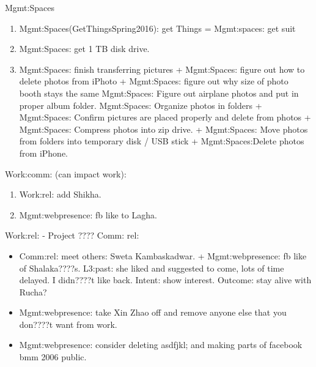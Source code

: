 {\begin{columns}
\begin{column}{0.5\columnwidth}
\begin{block}{Mgmt:Spaces}
\begin{enumerate} 
\item \tiny Mgmt:Spaces(GetThingsSpring2016): get Things = Mgmt:spaces: get suit
\item \tiny Mgmt:Spaces: get 1 TB disk drive. 
\item \tiny Mgmt:Spaces: finish transferring pictures + Mgmt:Spaces: figure out
how to delete photos from iPhoto + Mgmt:Spaces: figure out why size of
photo booth stays the same  Mgmt:Spaces: Figure out airplane photos
and put in proper album folder. Mgmt:Spaces: Organize photos in
folders + Mgmt:Spaces: Confirm pictures are placed properly and delete
from photos + Mgmt:Spaces: Compress photos into zip drive. +
Mgmt:Spaces: Move photos from folders into temporary disk / USB stick 
+ Mgmt:Spaces:Delete photos from iPhone.
\end{enumerate} 
\end{block}

\begin{block}{Work:comm: (can impact work):}
\begin{enumerate}
\tiny \item \tiny Work:rel: add Shikha.
\item \tiny Mgmt:webpresence: fb like to Lagha. 
\end{enumerate}
\end{block} 

\begin{block}{Work:rel: -  Project ???? Comm: rel:}
\begin{itemize} 
\item \tiny Comm:rel: meet others:  Sweta Kambaskadwar. + Mgmt:webpresence: fb
like of Shalaka????s. L3:past: she liked and suggested to come, lots of
time delayed. I didn????t like back.  Intent: show interest. Outcome:
stay alive with Rucha?
\item \tiny Mgmt:webpresence: take Xin Zhao off and remove anyone else that you
don????t want from work.
\item \tiny Mgmt:webpresence: consider deleting asdfjkl;  and making parts of facebook bmm 2006 public. 
\end{itemize}
\end{block}


\end{column}
\end{columns}}
